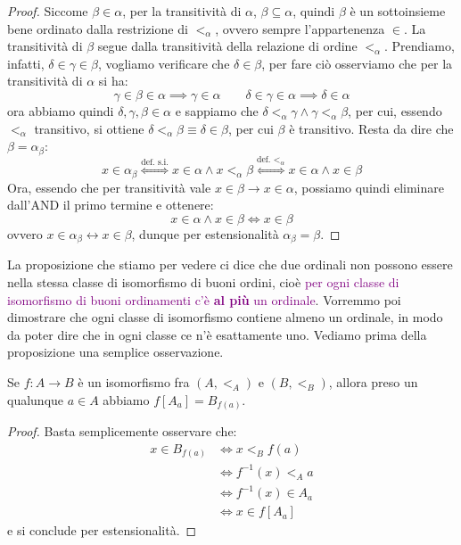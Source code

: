 \begin{proof}
	Siccome $\beta \in \alpha$, per la transitività di $\alpha$, $\beta \subseteq \alpha$, quindi $\beta$ è un sottoinsieme bene ordinato dalla restrizione di $<_\alpha$, ovvero sempre l'appartenenza $\in$.
	La transitività di $\beta$ segue dalla transitività della relazione di ordine $<_{\alpha}$. Prendiamo, infatti, $\delta \in \gamma \in \beta$, vogliamo verificare che $\delta \in \beta$, per fare ciò osserviamo che per la transitività di $\alpha$ si ha:
	\[ \gamma \in \beta \in \alpha \implies \gamma \in \alpha \qquad \delta \in \gamma \in \alpha \implies \delta \in \alpha
		\]
	ora abbiamo quindi $\delta,\gamma,\beta \in \alpha$ e sappiamo che $\delta <_\alpha \gamma \land \gamma <_\alpha \beta$, per cui, essendo $<_\alpha$ transitivo, si ottiene $\delta <_\alpha \beta \equiv \delta \in \beta$, per cui $\beta$ è transitivo.
	Resta da dire che $\beta = \alpha_\beta$:
	\[ x \in \alpha_\beta \overset{\text{def. s.i.}}{\iff} x \in \alpha \land x <_\alpha \beta \overset{\text{def. $<_\alpha$}}{\iff} x \in \alpha \land x \in \beta
		\]
	Ora, essendo che per transitività vale $x \in \beta \rightarrow x \in \alpha$, possiamo quindi eliminare dall'AND il primo termine e ottenere:
	\[ x \in \alpha \land x \in \beta \iff x \in \beta
		\]
	ovvero $x \in \alpha_\beta \leftrightarrow x \in \beta$, dunque per estensionalità $\alpha_\beta = \beta$.
\end{proof}

La proposizione che stiamo per vedere ci dice che due ordinali non possono essere nella stessa classe di isomorfismo di buoni ordini, cioè \textcolor{purple}{per ogni classe di isomorfismo di buoni ordinamenti c'è \textbf{al più} un ordinale}.
Vorremmo poi dimostrare che ogni classe di isomorfismo contiene almeno un ordinale, in modo da poter dire che in ogni classe ce n'è esattamente uno. Vediamo prima della proposizione una semplice osservazione.

\begin{remark}
	Se $f : A \rightarrow B$ è un isomorfismo fra $(A,<_A)$ e $(B,<_B)$, allora preso un qualunque $a \in A$ abbiamo $f[A_a] = B_{f(a)}$.
\end{remark}

\begin{proof}
	Basta semplicemente osservare che:
	\[\begin{split}
		x \in B_{f(a)} &\iff x <_B f(a) \\
					   &\iff f^{-1}(x) <_A a \\
					   &\iff f^{-1}(x) \in A_a \\
					   &\iff x \in f[A_a]
	\end{split}
		\]
	e si conclude per estensionalità.
\end{proof}

